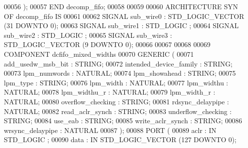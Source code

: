 \begin{DoxyCode}
{00056     \textcolor{vhdlchar}{)};
00057 \textcolor{keywordflow}{END} \textcolor{vhdlchar}{decomp\_fifo};
00058 
00059 
00060 \textcolor{keywordflow}{ARCHITECTURE} SYN \textcolor{keywordflow}{OF} decomp_fifo IS
00061 
00062     \textcolor{keywordflow}{SIGNAL} \textcolor{vhdlchar}{sub_wire0}    \textcolor{vhdlchar}{:} \textcolor{comment}{STD\_LOGIC\_VECTOR} \textcolor{vhdlchar}{(}\textcolor{vhdllogic}{}\textcolor{vhdllogic}{31} \textcolor{keywordflow}{DOWNTO} \textcolor{vhdllogic}{}\textcolor{vhdllogic}{0}\textcolor{vhdlchar}{)};
00063     \textcolor{keywordflow}{SIGNAL} \textcolor{vhdlchar}{sub_wire1}    \textcolor{vhdlchar}{:} \textcolor{comment}{STD\_LOGIC} ;
00064     \textcolor{keywordflow}{SIGNAL} \textcolor{vhdlchar}{sub_wire2}    \textcolor{vhdlchar}{:} \textcolor{comment}{STD\_LOGIC} ;
00065     \textcolor{keywordflow}{SIGNAL} \textcolor{vhdlchar}{sub_wire3}    \textcolor{vhdlchar}{:} \textcolor{comment}{STD\_LOGIC\_VECTOR} \textcolor{vhdlchar}{(}\textcolor{vhdllogic}{}\textcolor{vhdllogic}{9} \textcolor{keywordflow}{DOWNTO} \textcolor{vhdllogic}{}\textcolor{vhdllogic}{0}\textcolor{vhdlchar}{)};
00066 
00067 
00068 
00069     \textcolor{keywordflow}{COMPONENT} dcfifo\_mixed\_widths
00070     \textcolor{keywordflow}{GENERIC} (
00071         add\_usedw\_msb\_bit       : \textcolor{comment}{STRING};
00072         intended\_device\_family      : \textcolor{comment}{STRING};
00073         lpm\_numwords        : \textcolor{comment}{NATURAL};
00074         lpm\_showahead       : \textcolor{comment}{STRING};
00075         lpm\_type        : \textcolor{comment}{STRING};
00076         lpm\_width       : \textcolor{comment}{NATURAL};
00077         lpm\_widthu      : \textcolor{comment}{NATURAL};
00078         lpm\_widthu\_r        : \textcolor{comment}{NATURAL};
00079         lpm\_width\_r     : \textcolor{comment}{NATURAL};
00080         overflow\_checking       : \textcolor{comment}{STRING};
00081         rdsync\_delaypipe        : \textcolor{comment}{NATURAL};
00082         read\_aclr\_synch     : \textcolor{comment}{STRING};
00083         underflow\_checking      : \textcolor{comment}{STRING};
00084         use\_eab     : \textcolor{comment}{STRING};
00085         write\_aclr\_synch        : \textcolor{comment}{STRING};
00086         wrsync\_delaypipe        : \textcolor{comment}{NATURAL}
00087     );
00088     \textcolor{keywordflow}{PORT} (
00089             aclr    : \textcolor{keywordflow}{IN} \textcolor{comment}{STD\_LOGIC} ;
00090             data    : \textcolor{keywordflow}{IN} \textcolor{comment}{STD\_LOGIC\_VECTOR} (\textcolor{vhdllogic}{}\textcolor{vhdllogic}{127} \textcolor{keywordflow}{DOWNTO} \textcolor{vhdllogic}{}\textcolor{vhdllogic}{0});
}
\end{DoxyCode}
